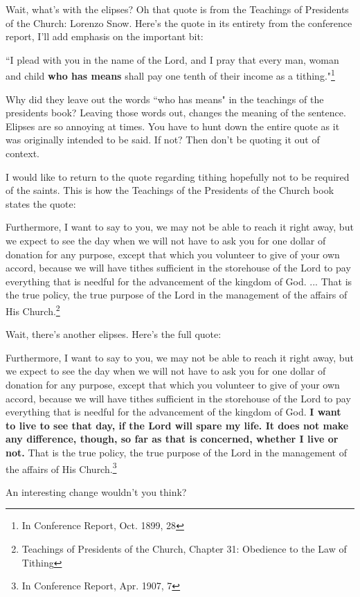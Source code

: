 Wait, what's with the elipses? Oh that quote is from the Teachings of Presidents of
the Church: Lorenzo Snow. Here's the quote in its entirety from the conference
report, I'll add emphasis on the important bit:

\begin{displayquote}
``I plead with you in the name of the Lord, and I pray that every man, woman and child 
\textbf{who has means} shall pay one tenth of their income as a tithing."\footnote{
In Conference Report, Oct. 1899, 28
}
\end{displayquote}

Why did they leave out the words ``who has means" in the teachings of the presidents
book? Leaving those words out, changes the meaning of the sentence. Elipses are so
annoying at times. You have to hunt down the entire quote as it was originally
intended to be said. If not? Then don't be quoting it out of context.

I would like to return to the quote regarding tithing hopefully not to be required of
the saints. This is how the Teachings of the Presidents of the Church book states the
quote:

\begin{displayquote}
Furthermore, I want to say to you, we may not be able to reach it right away, but we 
expect to see the day when we will not have to ask you for one dollar of donation for 
any purpose, except that which you volunteer to give of your own accord, because we 
will have tithes sufficient in the storehouse of the Lord to pay everything that is 
needful for the advancement of the kingdom of God. ... That is the true policy, the 
true purpose of the Lord in the management of the affairs of His 
Church.\footnote{Teachings of Presidents of the Church, Chapter 31: Obedience to the
Law of Tithing}
\end{displayquote}

Wait, there's another elipses. Here's the full quote:

\begin{displayquote}
Furthermore, I want to say to you, we may not be able to reach it right away, but we 
expect to see the day when we will not have to ask you for one dollar of donation for 
any purpose, except that which you volunteer to give of your own accord, because we 
will have tithes sufficient in the storehouse of the Lord to pay everything that is 
needful for the advancement of the kingdom of God. \textbf{I want to live to see that 
day, if the Lord will spare my life. It does not make any difference, though, so far 
as that is concerned, whether I live or not.} That is the true policy, the true 
purpose of the Lord in the management of the affairs of His 
Church.\footnote{In Conference Report, Apr. 1907, 7 }
\end{displayquote}

An interesting change wouldn't you think?